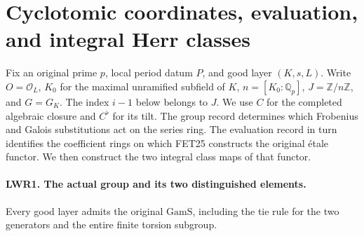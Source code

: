 \section{Cyclotomic coordinates, evaluation, and integral Herr classes}
\label{sec:wach-v059}

Fix an original prime $p$, local period datum $P$, and good layer
$(K,s,L)$. Write $O=\mathcal O_L$, $K_0$ for the maximal unramified
subfield of $K$, $n=[K_0:\mathbb Q_p]$, $J=\mathbb Z/n\mathbb Z$,
and $G=G_K$. The index $i-1$ below belongs to $J$. We use $C$ for
the completed algebraic closure and $C^\flat$ for its tilt. The group
record determines which Frobenius and Galois substitutions act on the
series ring. The evaluation record in turn identifies the coefficient
rings on which FET25 constructs the original \'etale functor. We then
construct the two integral class maps of that functor.

\paragraph{LWR1. The actual group and its two distinguished elements.}
\label{claim:LWR1}
Every good layer admits the original $\mathrm{GamS}$, including the
tie rule for the two generators and the entire finite torsion subgroup.


